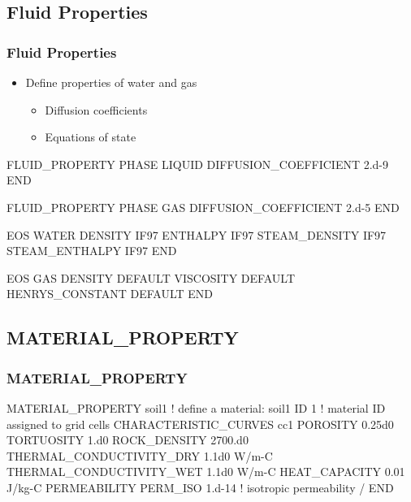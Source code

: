 \documentclass{beamer}
\newcommand\bluecomment[1]{{{\color{blue} #1}}}
\newcommand\greencomment[1]{{{\color{green} #1}}}
\begin{document}
\subsection{Fluid Properties}

\begin{frame}\frametitle{Fluid Properties}

\begin{itemize}
  \item Define properties of water and gas
  \begin{itemize}
    \item Diffusion coefficients
    \item Equations of state
  \end{itemize}
\end{itemize}

\begin{semiverbatim}
FLUID_PROPERTY
  PHASE LIQUID
  DIFFUSION_COEFFICIENT 2.d-9
END

FLUID_PROPERTY
  PHASE GAS
  DIFFUSION_COEFFICIENT 2.d-5
END

\newpage

EOS WATER
  DENSITY IF97
  ENTHALPY IF97
  STEAM_DENSITY IF97
  STEAM_ENTHALPY IF97
END

EOS GAS
  DENSITY DEFAULT
  VISCOSITY DEFAULT
  HENRYS_CONSTANT DEFAULT
END

\end{semiverbatim}

\end{frame}

\subsection{MATERIAL\_PROPERTY}

\begin{frame}\frametitle{MATERIAL\_PROPERTY}

\begin{semiverbatim}
MATERIAL_PROPERTY soil1  \bluecomment{! define a material:} \greencomment{soil1}
  ID 1             \bluecomment{! material ID assigned to grid cells}
  CHARACTERISTIC\_CURVES cc1
  POROSITY 0.25d0
  TORTUOSITY 1.d0
  ROCK_DENSITY 2700.d0
  THERMAL_CONDUCTIVITY_DRY 1.1d0 W/m-C
  THERMAL_CONDUCTIVITY_WET 1.1d0 W/m-C
  HEAT_CAPACITY 0.01 J/kg-C
  PERMEABILITY     
    PERM_ISO 1.d-14  \bluecomment{! isotropic permeability}
  /
END
\end{semiverbatim}

\end{frame}
\end{document}
